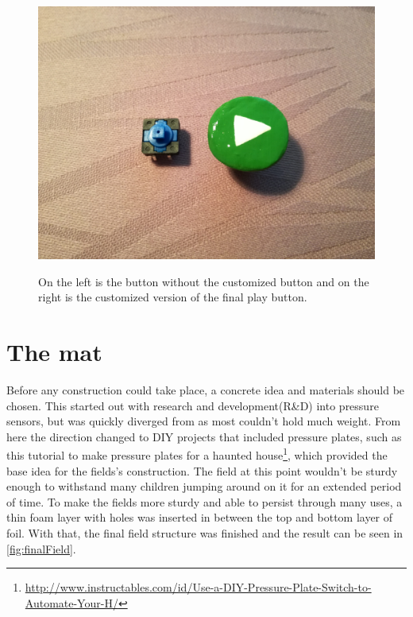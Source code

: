 	
		\begin{figure}[H]
			\centering
			\includegraphics[width=0.7\linewidth]{figure/Design/buttons}
			\label{fig:buttons}
			\caption{On the left is the button without the customized button and on the right is the customized version of the final play button.}
			
		\end{figure}
		
\section{The mat}\label{sec:theMat}%
	Before any construction could take place, a concrete idea and materials should be chosen. This started out with research and development(R\&D) into pressure sensors, but was quickly diverged from as most couldn't hold much weight. From here the direction changed to DIY projects that included pressure plates, such as this tutorial to make pressure plates for a haunted house\footnote{\url{http://www.instructables.com/id/Use-a-DIY-Pressure-Plate-Switch-to-Automate-Your-H/}}, which provided the base idea for the fields's construction. The field at this point wouldn't be sturdy enough to withstand many children jumping around on it for an extended period of time. To make the fields more sturdy and able to persist through many uses, a thin foam layer with holes was inserted in between the top and bottom layer of foil. With that, the final field structure was finished and the result can be seen in \autoref{fig:finalField}.\\
	
